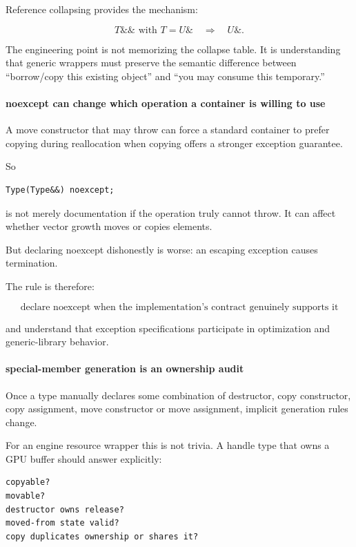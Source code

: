 Reference collapsing provides the mechanism:

\[
T\&\& \text{ with } T=U\&
\quad\Rightarrow\quad
U\&.
\]

The engineering point is not memorizing the collapse table. It is understanding that generic wrappers must preserve the semantic difference between ``borrow/copy this existing object'' and ``you may consume this temporary.''

\paragraph{noexcept can change which operation a container is willing to use}\label{noexcept-can-change-which-operation-a-container-is-willing-to-use}

A move constructor that may throw can force a standard container to prefer copying during reallocation when copying offers a stronger exception guarantee.

So

\begin{verbatim}
Type(Type&&) noexcept;
\end{verbatim}

is not merely documentation if the operation truly cannot throw. It can affect whether vector growth moves or copies elements.

But declaring noexcept dishonestly is worse: an escaping exception causes termination.

The rule is therefore:

\[
\boxed{
\text{declare noexcept when the implementation's contract genuinely supports it}
}
\]

and understand that exception specifications participate in optimization and generic-library behavior.

\paragraph{special-member generation is an ownership audit}\label{special-member-generation-is-an-ownership-audit}

Once a type manually declares some combination of destructor, copy constructor, copy assignment, move constructor or move assignment, implicit generation rules change.

For an engine resource wrapper this is not trivia. A handle type that owns a GPU buffer should answer explicitly:

\begin{verbatim}
copyable?
movable?
destructor owns release?
moved-from state valid?
copy duplicates ownership or shares it?
\end{verbatim}

